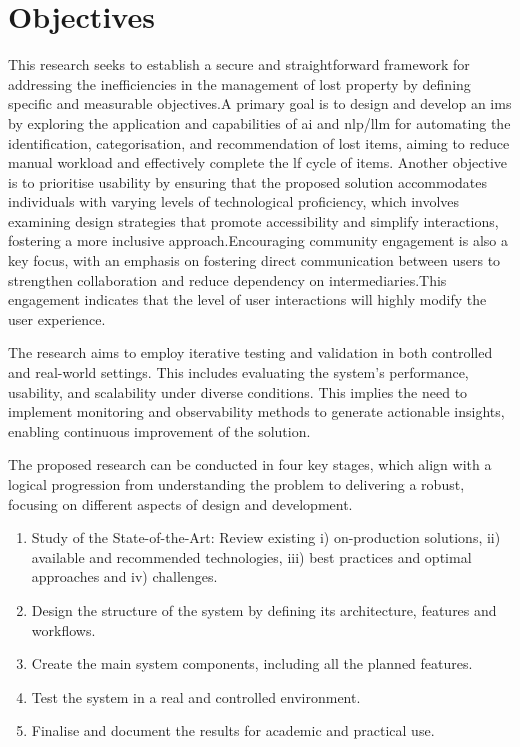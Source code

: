 \section{Objectives}

This research seeks to establish a secure and straightforward framework for addressing the inefficiencies in the management of lost property by defining specific and measurable objectives.A primary goal is to design and develop an \ac{ims} by exploring the application and capabilities of \ac{ai} and \ac{nlp}/\ac{llm} for automating the identification, categorisation, and recommendation of lost items, aiming to reduce manual workload and effectively complete the \ac{lf} cycle of items. Another objective is to prioritise usability by ensuring that the proposed solution accommodates individuals with varying levels of technological proficiency, which involves examining design strategies that promote accessibility and simplify interactions, fostering a more inclusive approach.Encouraging community engagement is also a key focus, with an emphasis on fostering direct communication between users to strengthen collaboration and reduce dependency on intermediaries.This engagement indicates that the level of user interactions will highly modify the user experience.

The research aims to employ iterative testing and validation in both controlled and real-world settings. This includes evaluating the system's performance, usability, and scalability under diverse conditions. This implies the need to implement monitoring and observability methods to generate actionable insights, enabling continuous improvement of the solution.

The proposed research can be conducted in four key stages, which align with a logical progression from understanding the problem to delivering a robust, focusing on different aspects of design and development.

\begin{enumerate}
    \item Study of the State-of-the-Art: Review existing i) on-production solutions, ii) available and recommended technologies, iii) best practices and optimal approaches and iv) challenges.
    \item Design the structure of the system by defining its architecture, features and workflows.
    \item Create the main system components, including all the planned features.
    \item Test the system in a real and controlled environment.
    \item Finalise and document the results for academic and practical use.
\end{enumerate}

